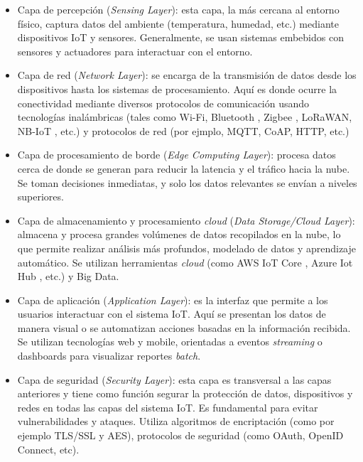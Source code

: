 \begin{itemize}

	\item Capa de percepción (\textit{Sensing Layer}): esta capa, la más cercana al entorno físico, captura datos del ambiente (temperatura, humedad, etc.) mediante dispositivos IoT y sensores. Generalmente, se usan sistemas embebidos con sensores y actuadores para interactuar con el entorno.
	
	\item Capa de red (\textit{Network Layer}): se encarga de la transmisión de datos desde los dispositivos hasta los sistemas de procesamiento. Aquí es donde ocurre la conectividad mediante diversos protocolos de comunicación usando tecnologías inalámbricas (tales como Wi-Fi, Bluetooth \citep{Bluetooth}, Zigbee \citep{zigbee}, LoRaWAN, NB-IoT \citep{Narrowband_IoT}, etc.) y protocolos de red (por ejmplo, MQTT, CoAP, HTTP, etc.)
	
	\item Capa de procesamiento de borde (\textit{Edge Computing Layer}): procesa datos cerca de donde se generan para reducir la latencia y el tráfico hacia la nube. Se toman decisiones inmediatas, y solo los datos relevantes se envían a niveles superiores. 
	
	\item Capa de almacenamiento y procesamiento \textit{cloud} (\textit{Data Storage/Cloud Layer}): almacena y procesa grandes volúmenes de datos recopilados en la nube, lo que permite realizar análisis más profundos, modelado de datos y aprendizaje automático. Se utilizan herramientas \textit{cloud} (como AWS IoT Core \citep{aws_iot_core}, Azure Iot Hub \citep{azure_iot}, etc.) y Big Data.
	
	\item Capa de aplicación (\textit{Application Layer}): es la interfaz que permite a los usuarios interactuar con el sistema IoT. Aquí se presentan los datos de manera visual o se automatizan acciones basadas en la información recibida. Se utilizan tecnologías web y mobile, orientadas a eventos \textit{streaming} o dashboards para visualizar reportes \textit{batch}.
	
	\item Capa de seguridad (\textit{Security Layer}): esta capa es transversal a las capas anteriores y tiene como función segurar la protección de datos, dispositivos y redes en todas las capas del sistema IoT. Es fundamental para evitar vulnerabilidades y ataques. Utiliza algoritmos de encriptación (como por ejemplo TLS/SSL y AES), protocolos de seguridad (como OAuth, OpenID Connect, etc).
	
\end{itemize}


